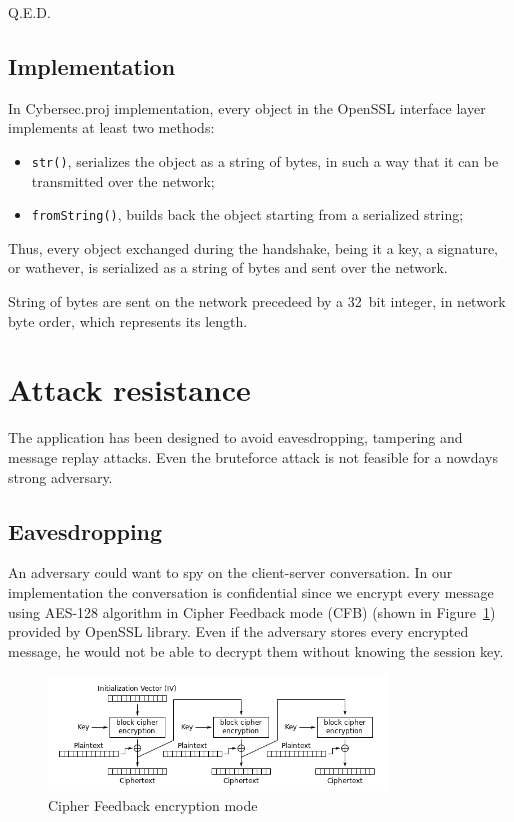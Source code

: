 \documentclass[a4paper,12pt]{article}
\newcommand{\projectname}{Cybersec.proj}
\begin{document}
Q.E.D.

\subsection{Implementation}
In \projectname{} implementation, every object in the OpenSSL interface layer implements at least two methods:
\begin{itemize}
  \item \texttt{str()}, serializes the object as a string of bytes, in such a way that it can be transmitted over the network;
  \item \texttt{fromString()}, builds back the object starting from a serialized string;
\end{itemize}

Thus, every object exchanged during the handshake, being it a key, a signature, or wathever, is serialized as a string of bytes and sent over the network.

String of bytes are sent on the network precedeed by a 32~bit integer, in network byte order, which represents its length.

\section{Attack resistance}

The application has been designed to avoid eavesdropping, tampering and message replay attacks. Even the bruteforce attack is not feasible for a nowdays strong adversary.

\subsection{Eavesdropping}
An adversary could want to spy on the client-server conversation. In our implementation the conversation is confidential since we encrypt every message using AES-128 algorithm in Cipher Feedback mode (CFB) (shown in Figure~\ref{img:cfb-enc-mode}) provided by OpenSSL library.
Even if the adversary stores every encrypted message, he would not be able to decrypt them without knowing the session key.

\begin{figure}[H]
\centering
\includegraphics[width=0.8\textwidth]{img/CFB-enc-mode}
\caption{Cipher Feedback encryption mode}
\label{img:cfb-enc-mode}
\end{figure}
\end{document}
